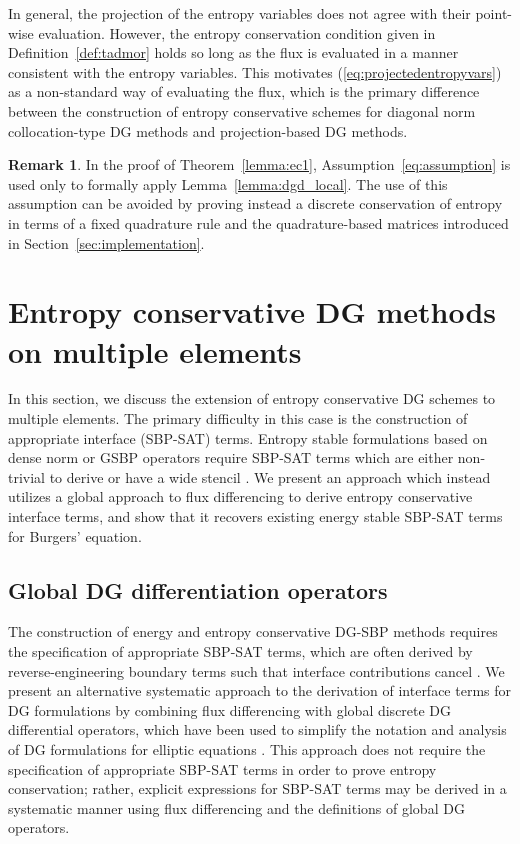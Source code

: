 \documentclass[preprint,10pt]{article}
\theoremstyle{definition}
\theoremstyle{lemma}
\newtheorem*{remark}{Remark}
\theoremstyle{theorem}
\theoremstyle{assumption}
\begin{document}
In general, the projection of the entropy variables does not agree with their point-wise evaluation.  However, the entropy conservation condition given in Definition~\ref{def:tadmor} holds so long as the flux is evaluated in a manner consistent with the entropy variables.  This motivates (\ref{eq:projectedentropyvars}) as a non-standard way of evaluating the flux, which is the primary difference between the construction of entropy conservative schemes for diagonal norm collocation-type DG methods and projection-based DG methods.  


\begin{remark}
In the proof of Theorem~\ref{lemma:ec1}, Assumption~\ref{eq:assumption} is used only to formally apply Lemma~\ref{lemma:dgd_local}.  The use of this assumption can be avoided by proving instead a discrete conservation of entropy in terms of a fixed quadrature rule and the quadrature-based matrices introduced in Section~\ref{sec:implementation}.  
\end{remark}

\section{Entropy conservative DG methods on multiple elements}
\label{sec:ecdg2}

In this section, we discuss the extension of entropy conservative DG schemes to multiple elements.  The primary difficulty in this case is the construction of appropriate interface (SBP-SAT) terms.  Entropy stable formulations based on dense norm or GSBP operators require SBP-SAT terms which are either non-trivial to derive or have a wide stencil \cite{fernandez2016simultaneous, ranocha2017extended}.  We present an approach which instead utilizes a global approach to flux differencing to derive entropy conservative interface terms, and show that it recovers existing energy stable SBP-SAT terms for Burgers' equation.  

\subsection{Global DG differentiation operators}

The construction of energy and entropy conservative DG-SBP methods requires the specification of appropriate SBP-SAT terms, which are often derived by reverse-engineering  boundary terms such that interface contributions cancel \cite{fernandez2016simultaneous, ranocha2017comparison, ranocha2017extended}.  We present an alternative systematic approach to the derivation of interface terms for DG formulations by combining flux differencing with global discrete DG differential operators, which have been used to simplify the notation and analysis of DG formulations for elliptic equations \cite{di2011mathematical, wang2013weak}.  This approach does not require the specification of appropriate SBP-SAT terms in order to prove entropy conservation; rather, explicit expressions for SBP-SAT terms may be derived in a systematic manner using flux differencing and the definitions of global DG operators.  
\end{document}
